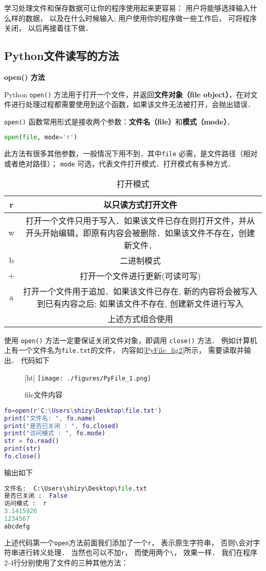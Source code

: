 

学习处理文件和保存数据可让你的程序使用起来更容易： 用户将能够选择输入什么样的数据， 以及在什么时候输入; 用户使用你的程序做一些工作后， 可将程序关闭， 以后再接着往下做．
\subsection{Python文件读写的方法}
\textbf{open() 方法}

Python \verb|open()| 方法用于打开一个文件，并返回\textbf{文件对象（file object）}，在对文件进行处理过程都需要使用到这个函数，如果该文件无法被打开，会抛出错误．

\verb|open()| 函数常用形式是接收两个参数：\textbf{文件名（file）}和\textbf{模式（mode）}．
\begin{lstlisting}[language=python]
open(file, mode='r')
\end{lstlisting}
此方法有很多其他参数，一般情况下用不到．其中\verb|file| 必需，是文件路径（相对或者绝对路径）； \verb|mode| 可选，代表文件打开模式．打开模式有多种方式．
\begin{table}[ht]
\centering
\caption{打开模式}\label{PyFile_tab1}
\begin{tabular}{|c|c|}
\hline
r & 以只读方式打开文件 \\
\hline
w & 打开一个文件只用于写入．如果该文件已存在则打开文件，并从开头开始编辑，即原有内容会被删除．如果该文件不存在，创建新文件． \\
\hline
b & 二进制模式 \\
\hline
+ & 打开一个文件进行更新(可读可写) \\
\hline
a & 打开一个文件用于追加．如果该文件已存在, 新的内容将会被写入到已有内容之后; 如果该文件不存在, 创建新文件进行写入 \\
\hline
&上述方式组合使用   \\
\hline
\end{tabular}
\end{table}

使用 \verb|open()| 方法一定要保证关闭文件对象，即调用 \verb|close()| 方法． 例如计算机上有一个文件名为\verb|file.txt|的文件， 内容如\autoref{PyFile_fig2}所示， 需要读取并输出． 代码如下
\begin{figure}\label{PyFile_fig2}[ht]
\centering
\texttt{[image: ./figures/PyFile\_1.png]}
\caption{file文件内容} \label{PyFile_fig1}
\end{figure}
\begin{lstlisting}[language=matlab]
fo=open(r'C:\Users\shizy\Desktop\file.txt')
print("文件名: ", fo.name)
print("是否已关闭 : ", fo.closed)
print("访问模式 : ", fo.mode)
str = fo.read()
print(str)
fo.close()
\end{lstlisting}
输出如下
\begin{lstlisting}[language=python]
文件名:  C:\Users\shizy\Desktop\file.txt
是否已关闭 :  False
访问模式 :  r
3.1415926
1234567
abcdefg
\end{lstlisting}
上述代码第一个\verb|open|方法前面我们添加了一个\verb|r|， 表示原生字符串， 否则\verb|\|会对字符串进行转义处理． 当然也可以不加\verb|r|， 而使用两个\verb|\|， 效果一样． 我们在程序2-4行分别使用了文件的三种其他方法：

